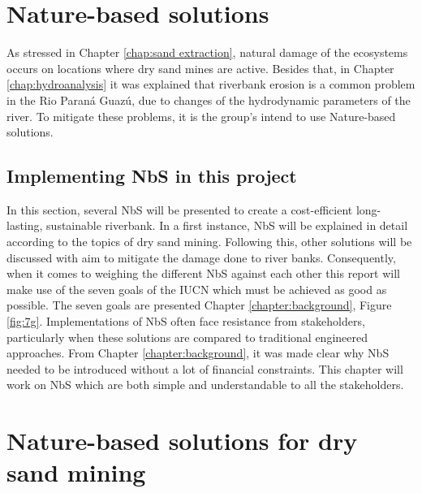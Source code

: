 
\newpage
\section{Nature-based solutions}
As stressed in Chapter \ref{chap:sand extraction}, natural damage of the ecosystems occurs on locations where dry sand mines are active. Besides that, in Chapter \ref{chap:hydroanalysis} it was explained that riverbank erosion is a common problem in the Rio Paraná Guazú, due to changes of the hydrodynamic parameters of the river. To mitigate these problems, it is the group's intend to use Nature-based solutions.

\subsection{Implementing NbS in this project}
In this section, several NbS will be presented to create a cost-efficient long-lasting, sustainable riverbank. In a first instance, NbS will be explained in detail according to the topics of dry sand mining. Following this, other solutions will be discussed with aim to mitigate the damage done to river banks. Consequently, when it comes to weighing the different NbS against each other this report will make use of the seven goals of the IUCN which must be achieved as good as possible. The seven goals are presented Chapter \ref{chapter:background}, Figure \ref{fig:7g}. Implementations of NbS often face resistance from stakeholders, particularly when these solutions are compared to traditional engineered approaches. From Chapter \ref{chapter:background}, it was made clear why NbS needed to be introduced without a lot of financial constraints. This chapter will work on NbS which are both simple and understandable to all the stakeholders. 


\section{Nature-based solutions for dry sand mining}

